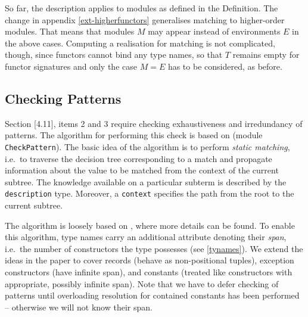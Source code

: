 \documentclass[twoside,titlepage]{article}
\newcommand{\void}[1]{}
\begin{document}
So far, the description applies to modules as defined in the Definition. The change in appendix \ref{ext-higherfunctors} generalises matching to higher-order modules. That means that modules $M$ may appear instead of environments $E$ in the above cases. Computing a realisation for matching is not complicated, though, since functors cannot bind any type names, so that $T$ remains empty for functor signatures and only the case $M=E$ has to be considered, as before.

\void{
However, the definition of enrichment becomes now mutually recursive with the additional concept of matching on functor signatures. This induces a mutual recursion between the function {\tt StaticEnv.enriches} checking enrichment and {\tt FunSig.matches} implementing functor signature matching. Short of recursive modules in SML, this recursion is implemented with the well-known trick of using a forwarding reference in module {\tt StaticEnv} that ties the recursive knot via assignment in module {\tt FunSig}.
}

\subsection{Checking Patterns}
\label{patterns}

Section [4.11], items 2 and 3 require checking exhaustiveness and irredundancy of patterns. The algorithm for performing this check is based on \cite{patterns} (module {\tt CheckPattern}). The basic idea of the algorithm is to perform {\em static matching}, i.e.\ to traverse the decision tree corresponding to a match and propagate information about the value to be matched from the context of the current subtree. The knowledge available on a particular subterm is described by the {\tt description} type. Moreover, a {\tt context} specifies the path from the root to the current subtree.

The algorithm is loosely based on \cite{patterns}, where more details can be found. To enable this algorithm, type names carry an additional attribute denoting their {\em span}, i.e.\ the number of constructors the type possesses (see \ref{tynames}). We extend the ideas in the paper to cover records (behave as non-positional tuples), exception constructors (have infinite span), and constants (treated like constructors with appropriate, possibly infinite span). Note that we have to defer checking of patterns until overloading resolution for contained constants has been performed -- otherwise we will not know their span.
\end{document}
